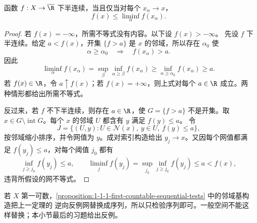\begin{theorem}[半连续性的网判别]\label{theorem:1-2-3-1}
函数 \(f:X\to\overline\R\) 下半连续，当且仅当对每个 \(x_\alpha\to x\)，
\[
 f(x)\le\liminf_\alpha f(x_\alpha).
\]
\end{theorem}
\begin{proof}
若 \(f(x)=-\infty\)，所需不等式没有内容。以下设 \(f(x)>-\infty\)。
先设 \(f\) 下半连续。给定 \(a<f(x)\)，开集 \(\{f>a\}\) 是 \(x\) 的邻域，所以存在
\(\alpha_0\) 使
\[
  \alpha\ge\alpha_0\quad\Longrightarrow\quad f(x_\alpha)>a.
\]
因此
\[
  \liminf_\alpha f(x_\alpha)
  =\sup_\beta\inf_{\alpha\ge\beta}f(x_\alpha)
  \ge \inf_{\alpha\ge\alpha_0}f(x_\alpha)\ge a.
\]
若 \(f(x)\in\R\)，令 \(a\uparrow f(x)\)；若 \(f(x)=+\infty\)，则上式对每个 \(a\in\R\)
成立。两种情形都给出所需不等式。

反过来，若 \(f\) 不下半连续，则存在 \(a\in\R\)，使 \(G=\{f>a\}\) 不是开集。取
\(x\in G\setminus\operatorname{int}G\)。每个 \(x\) 的邻域 \(U\) 都含有 \(y\) 满足 \(f(y)\le a\)。
令
\[
 J=\{(U,y):U\in\mathcal N(x),\ y\in U,\ f(y)\le a\},
\]
按邻域缩小排序，并令网值为 \(y\)。成对索引构造给出 \(y_j\to x\)。又因每个网值都满足
\(f(y_j)\le a\)，对每个阈值 \(j_0\) 都有
\[
  \inf_{j\ge j_0}f(y_j)\le a,
  \qquad
  \liminf_jf(y_j)=\sup_{j_0}\inf_{j\ge j_0}f(y_j)\le a<f(x),
\]
违背所假设的网不等式。
\end{proof}

\begin{remark}
若 \(X\) 第一可数，\cref{proposition:1-1-1-first-countable-sequential-tests} 中的邻域基构造把上一定理的
逆向反例网替换成序列，所以只检验序列即可。一般空间不能这样替换；本小节最后的习题给出反例。
\end{remark}

